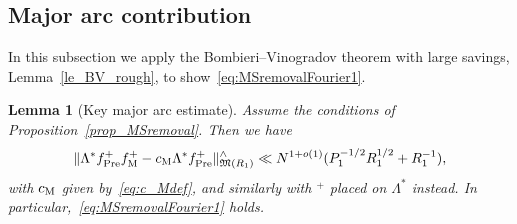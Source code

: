 \documentclass[12pt]{amsart}
\newtheorem{lemma}[theorem]{Lemma}
\theoremstyle{definition}
\theoremstyle{remark}
\numberwithin{equation}{section}
\newcommand{\1}{\mathbf{1}}
\begin{document}
\subsection{Major arc contribution}\label{subsec:major}


In this subsection we apply the Bombieri--Vinogradov theorem with large savings, Lemma~\ref{le_BV_rough}, to show~\eqref{eq:MSremovalFourier1}.
\begin{lemma}[Key major arc estimate]\label{lem:majorarcbound}
Assume the conditions of Proposition~\ref{prop_MSremoval}. Then we have
    \begin{align*}
        \|\Lambda^*  f_{\mathrm{{Pre}}}^+ f_\textup{M}^+ -c_{\textup{M}}\Lambda^*  f_{\mathrm{{Pre}}}^+ \|^{\wedge}_{\mathfrak{M}(R_1)}\ll N^{1+o(1)}(P_1^{-1/2} R_1^{1/2}+R_1^{-1}),
    \end{align*}
    with $c_{\textup{M}}$ given by~\eqref{eq:c_Mdef}, and similarly with $^+$ placed on $\Lambda^{*}$ instead. In particular,~\eqref{eq:MSremovalFourier1} holds.
\end{lemma}
\end{document}
